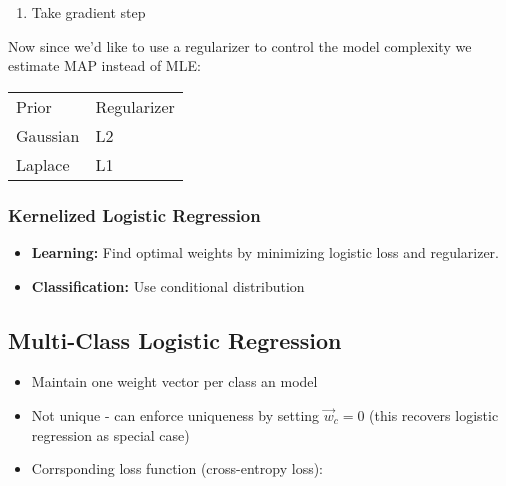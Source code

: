 \documentclass[10pt,a4paper]{scrartcl}
\newcommand{\Argmin}[2]{\text{arg}\underset{#1}{\min}\left(#2\right)}
\begin{document}
\begin{multicols*}{2}
\begin{enumerate}
\begin{enumerate}

\item Take gradient step

\end{enumerate}
\end{enumerate}

Now since we'd like to use a regularizer to control the model complexity we estimate MAP instead of MLE:

\begin{center}
\begin{tabular}{ll}
Prior&Regularizer\\
Gaussian&L2\\
Laplace&L1
\end{tabular}
\end{center}

\subsubsection{Kernelized Logistic Regression}

\begin{itemize}
\item \textbf{Learning:} Find optimal weights by minimizing logistic loss and regularizer.

\mportant{$\hat{\alpha}=\Argmin{\alpha}{\sum\limits_{i=1}^n\log\left(1+\exp\left(-y_i\alpha^T\vec{K}_i\right)\right)+\lambda\alpha^T \vec{K}\alpha}$}
\item \textbf{Classification:} Use conditional distribution

\end{itemize}

\subsection{Multi-Class Logistic Regression}

\begin{itemize}
\item Maintain one weight vector per class an model

\item Not unique - can enforce uniqueness by setting $\vec{w}_c=0$ (this recovers logistic regression as special case)
\item Corrsponding loss function (cross-entropy loss):


\end{itemize}
\end{multicols*}
\end{document}
